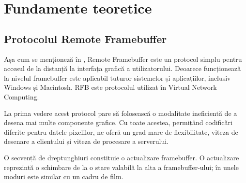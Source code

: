 \chapter{Fundamente teoretice}
\label{cap:fund-teoretice}

%
%
%

\section{Protocolul Remote Framebuffer}
Așa cum se menționeză în \cite{rfb}, Remote Framebuffer este un protocol simplu pentru accesul de la distanță la interfața grafică a utilizatorului. Deoarece funcționează la nivelul framebuffer este aplicabil tuturor sistemelor și aplicațiilor, inclusiv Windows și Macintosh. RFB este
protocolul utilizat în Virtual Network Computing.

La prima vedere acest protocol pare să folosească o modalitate ineficientă de a desena mai multe componente grafice. Cu toate acestea, permițând codificări diferite pentru datele pixelilor, ne oferă un grad mare de flexibilitate, viteza de desenare a clientului și viteza de procesare a serverului.

O secvență de dreptunghiuri constituie o actualizare framebuffer. O actualizare reprezintă o schimbare de la o stare valabilă la alta a framebuffer-ului; în unele moduri este similar cu un cadru de film. 

